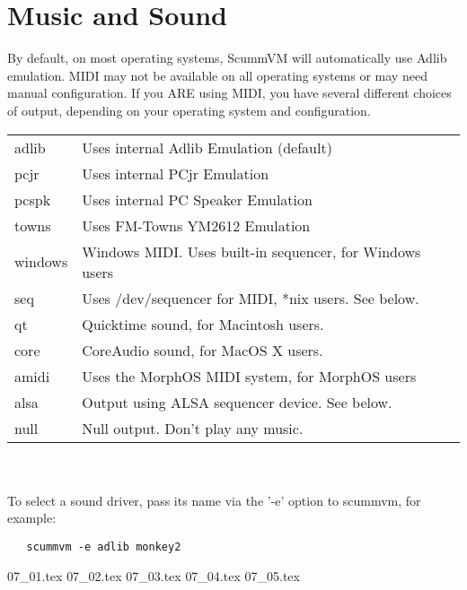 

\section{Music and Sound}
By default, on most operating systems, ScummVM will automatically use Adlib
emulation. MIDI may not be available on all operating systems or may need
manual configuration. If you ARE using MIDI, you have several different
choices of output, depending on your operating system and configuration.\\
\begin{tabular}[h]{ll}
  adlib     & Uses internal Adlib Emulation (default)\\
  pcjr      & Uses internal PCjr Emulation \\
  pcspk     & Uses internal PC Speaker Emulation\\
  towns     & Uses FM-Towns YM2612 Emulation\\
  windows   & Windows MIDI. Uses built-in sequencer, for Windows users\\
  seq       & Uses /dev/sequencer for MIDI, *nix users. See below.\\
  qt        & Quicktime sound, for Macintosh users.\\
  core      & CoreAudio sound, for MacOS X users.\\
  amidi     & Uses the MorphOS MIDI system, for MorphOS users\\
  alsa      & Output using ALSA sequencer device. See below.\\
  null      & Null output. Don't play any music.\\
\end{tabular}\\
~\\
To select a sound driver, pass its name via the '-e' option to scummvm,
for example:
\begin{verbatim}
   scummvm -e adlib monkey2
\end{verbatim}

 {07_01.tex}
 {07_02.tex}
 {07_03.tex}
 {07_04.tex}
 {07_05.tex}